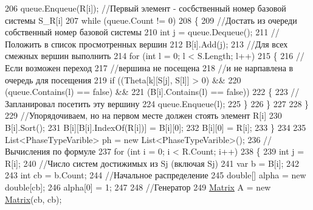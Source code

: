 \begin{DoxyCode}
206                 queue.Enqueue(R[i]); \textcolor{comment}{//Первый элемент - сосбственный номер базовой системы S\_R[i]}
207                 \textcolor{keywordflow}{while} (queue.Count != 0)
208                 \{
209                     \textcolor{comment}{//Достать из очереди собственный номер базовой системы}
210                     \textcolor{keywordtype}{int} j = queue.Dequeue();
211                     \textcolor{comment}{//Положить в список просмотренных вершин }
212                     B[i].Add(j);
213                     \textcolor{comment}{//Для всех смежных вершин выполнить }
214                     \textcolor{keywordflow}{for} (\textcolor{keywordtype}{int} l = 0; l < S.Length; l++)
215                     \{
216                         \textcolor{comment}{//Если возможен переход}
217                         \textcolor{comment}{//вершина не посещена}
218                         \textcolor{comment}{//и не нарпавлена в очередь для посещения }
219                         \textcolor{keywordflow}{if} ((Theta[k][S[j], S[l]] > 0) &&
220                             (queue.Contains(l) == \textcolor{keyword}{false}) &&
221                             (B[i].Contains(l) == \textcolor{keyword}{false}))
222                         \{
223                             \textcolor{comment}{//Запланировал посетить эту вершину}
224                             queue.Enqueue(l);
225                         \}
226                     \}
227 
228                 \}
229                 \textcolor{comment}{//Упорядочиваем, но на первом месте должен стоять элемент R[i]}
230                 B[i].Sort();
231                 B[i][B[i].IndexOf(R[i])] = B[i][0];
232                 B[i][0] = R[i];
233             \}
234 
235             List<PhaseTypeVarible> ph = \textcolor{keyword}{new} List<PhaseTypeVarible>();
236             \textcolor{comment}{//Вычисления по формуле }
237             \textcolor{keywordflow}{for} (\textcolor{keywordtype}{int} i = 0; i < R.Count; i++)
238             \{
239                 \textcolor{keywordtype}{int} j = R[i];
240                 \textcolor{comment}{//Число систем достижимых из Sj (включая Sj)}
241                 var b = B[i];
242 
243                 \textcolor{keywordtype}{int} cb = b.Count;
244                 \textcolor{comment}{//Начальное распределение }
245                 \textcolor{keywordtype}{double}[] alpha = \textcolor{keyword}{new} \textcolor{keywordtype}{double}[cb];
246                 alpha[0] = 1;
247 
248                 \textcolor{comment}{//Генератор }
249                 \hyperlink{class_b_l_a_s_1_1_matrix}{Matrix} A = \textcolor{keyword}{new} \hyperlink{class_b_l_a_s_1_1_matrix}{Matrix}(cb, cb);

\end{DoxyCode}
